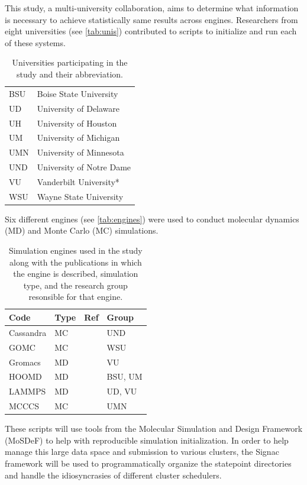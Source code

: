 This study, a multi-university collaboration, aims to determine what information is necessary to achieve statistically same results across engines.
Researchers from eight universities (see \autoref{tab:unis}) contributed to scripts to initialize and run each of these systems.
\begin{table}[h!]
\caption{Universities participating in the study and their abbreviation.}\label{tab:unis}
\centering
\begin{tabular}{ll}
BSU & Boise State University \\
UD & University of Delaware \\
UH & University of Houston \\
UM & University of Michigan \\
UMN & University of Minnesota \\
UND & University of Notre Dame \\
VU & Vanderbilt University* \\
WSU & Wayne State University
\end{tabular}
\end{table}
Six different engines (see \autoref{tab:engines}) were used to conduct molecular dynamics (MD) and Monte Carlo (MC) simulations.
\begin{table}[h!]
\caption{Simulation engines used in the study along with the publications in which the engine is described, simulation type, and the research group resonsible for that engine.}\label{tab:engines}
\centering
\begin{tabular}{llll}
Code      & Type & Ref             & Group   \\ \hline
Cassandra & MC   & \cite{Shah2017} & UND     \\
GOMC      & MC   & \cite{Shah2017} & WSU     \\
Gromacs   & MD   & \cite{ABRAHAM201519, Pall2015, 10.1093/bioinformatics/btt055, Lindahl2001, BERENDSEN199543, https://doi.org/10.1002/jcc.20291, Hess2008} & VU      \\
HOOMD     & MD   & \cite{Anderson2020, Nguyen2011a, Glaser2020a, Lebard2012} & BSU, UM \\
LAMMPS    & MD   & \cite{LAMMPS} & UD, VU  \\
MCCCS     & MC   & \cite{C8SC05340E,Josephson2019} & UMN    
\end{tabular}
\end{table}
These scripts will use tools from the Molecular Simulation and Design Framework (MoSDeF) to help with reproducible simulation initialization.
In order to help manage this large data space and submission to various clusters, the Signac framework will be used to programmatically organize the statepoint directories and handle the idiosyncrasies of different cluster schedulers.
